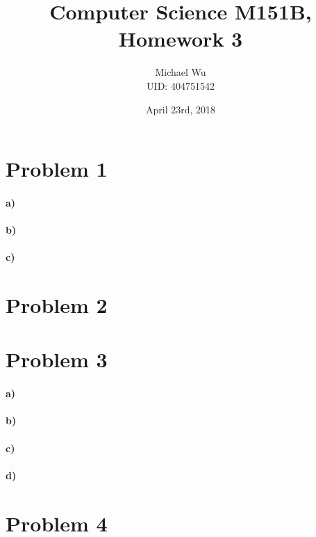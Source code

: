 \documentclass[12pt]{article}
\begin{document}
\title{Computer Science M151B, Homework 3}
\date{April 23rd, 2018}
\author{Michael Wu\\UID: 404751542}
\maketitle

\section*{Problem 1}

\paragraph{a)}

\paragraph{b)}

\paragraph{c)}

\section*{Problem 2}

\section*{Problem 3}

\paragraph{a)}

\paragraph{b)}

\paragraph{c)}

\paragraph{d)}

\section*{Problem 4}
\end{document}
